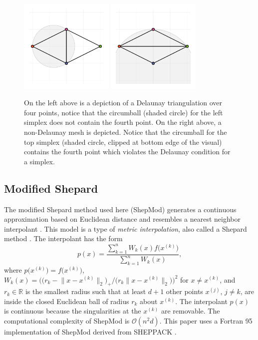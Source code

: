 \begin{figure}
  \centering
  \includegraphics[width=0.4\textwidth,]{Figures/NA/example_delaunay.pdf}
  \includegraphics[width=0.4\textwidth,]{Figures/NA/example_not_delaunay.pdf}
  \caption{On the left above is a depiction of a Delaunay
    triangulation over four points, notice that the circumball (shaded
    circle) for the left simplex does not contain the fourth point.
    On the right above, a non-Delaunay mesh is depicted. Notice that
    the circumball for the top simplex (shaded circle, clipped at
    bottom edge of the visual) contains the fourth point which
    violates the Delaunay condition for a simplex.
  \vspace{-.1cm}}
  \label{fig:delaunay}
\end{figure}


\subsection{Modified Shepard}
\label{sec:modified-shepard}

The modified Shepard method used here (ShepMod) generates a continuous
approximation based on Euclidean distance and resembles a nearest
neighbor interpolant \cite{cover1967nearest}. This model is a type of
\textit{metric interpolation}, also called a Shepard method
\cite{gordon1978shepard,shepard1968two}. The interpolant has the form
 $$ p(x) = \frac{\sum\limits_{k=1}^{n}W_k(x)f\bigl(x^{(k)}\bigr)}
     {\sum\limits_{k=1}^{n}W_k(x)} ,$$ where
     $p\bigl(x^{(k)}\bigr) = f\bigl(x^{(k)}\bigr)$, $W_k(x) =
       \bigl(\bigl(r_k - \bigl\|x - x^{(k)}\bigr\|_2\bigr)_+ \big/
       \bigl( r_k \bigl\|x - x^{(k)}\bigr\|_2 \bigr)\bigr)^2$ for $x
       \neq x^{(k)}$, and $r_k \in \mathbb{R}$ is the smallest
     radius such that at least $d+1$ other points $x^{(j)}$, $j \not =
     k$, are inside the closed Euclidean ball of radius $r_k$ about
     $x^{(k)}$. The interpolant $p(x)$ is continuous because
       the singularities at the $x^{(k)}$ are removable. The
     computational complexity of ShepMod is $\mathcal{O}(n^2d)$. This
     paper uses a Fortran 95 implementation of ShepMod derived from
     SHEPPACK \cite{thacker2010algorithm}.

